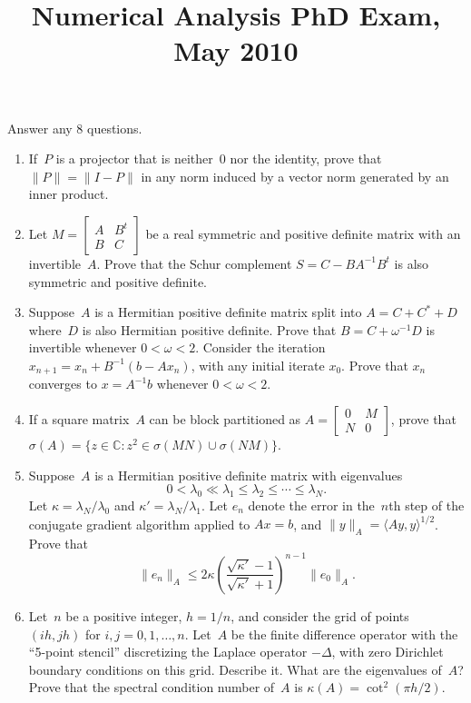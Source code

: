 \documentclass[11pt,letterpaper]{article}
\title{Numerical Analysis PhD Exam, May 2010}
\author{}
\date{}
\newenvironment{examproblems}[2]{%
  \def\ProblemHeadingTag{#2}%
  \AssignTaggingSocketPlug{block/list/label}{examproblem}%
  \begin{enumerate}%
  \setcounter{enumi}{#1}%
  \renewcommand{\labelenumi}{\textbf{\theenumi.}}%
  \setlength{\topsep}{0.35em}%
  \setlength{\partopsep}{0pt}%
  \setlength{\itemsep}{0.48em}%
  \setlength{\parsep}{0.18em}%
}{\end{enumerate}}
\newenvironment{examinstructions}{%
  \par\begingroup\itshape
}{%
  \par\endgroup\vspace{0.18em}
}
\begin{document}
\maketitle
\thispagestyle{empty}
\begin{examinstructions}
Answer any 8 questions.
\end{examinstructions}
\begin{examproblems}{0}{H2}
\def\ProblemHeadingText{Problem 1.}
\item
If~\(P\) is a projector that is neither~\(0\) nor the identity, prove that \(\lVert P\rVert=\lVert I-P\rVert\) in any norm induced by a vector norm generated by an inner product.
\def\ProblemHeadingText{Problem 2.}
\item
Let \(M=\begin{bmatrix}A&B^t\\B&C\end{bmatrix}\) be a real symmetric and positive definite matrix with an invertible~\(A\). Prove that the Schur complement \(S=C-BA^{-1}B^t\) is also symmetric and positive definite.
\def\ProblemHeadingText{Problem 3.}
\item
Suppose~\(A\) is a Hermitian positive definite matrix split into \(A=C+C^*+D\) where~\(D\) is also Hermitian positive definite. Prove that \(B=C+\omega^{-1}D\) is invertible whenever \(0<\omega<2\). Consider the iteration \(x_{n+1}=x_n+B^{-1}(b-Ax_n)\), with any initial iterate \(x_0\). Prove that \(x_n\) converges to \(x=A^{-1}b\) whenever \(0<\omega<2\).
\def\ProblemHeadingText{Problem 4.}
\item
If a square matrix~\(A\) can be block partitioned as \(A=\begin{bmatrix}0&M\\N&0\end{bmatrix}\), prove that \(\sigma(A)=\{z\in\mathbb{C}:z^2\in\sigma(MN)\cup\sigma(NM)\}\).
\def\ProblemHeadingText{Problem 5.}
\item
Suppose~\(A\) is a Hermitian positive definite matrix with eigenvalues
\[
0<\lambda_0\ll\lambda_1\leq\lambda_2\leq\cdots\leq\lambda_N.
\]
 Let \(\kappa=\lambda_N/\lambda_0\) and \(\kappa'=\lambda_N/\lambda_1\). Let \(e_n\) denote the error in the~\(n\)th step of the conjugate gradient algorithm applied to \(Ax=b\), and \(\lVert y\rVert_A=\langle Ay,y\rangle^{1/2}\). Prove that
\[
\lVert e_n\rVert_A\leq 2\kappa\left(\frac{\sqrt{\kappa'}-1}{\sqrt{\kappa'}+1}\right)^{n-1}\lVert e_0\rVert_A.
\]
\def\ProblemHeadingText{Problem 6.}
\item
Let~\(n\) be a positive integer, \(h=1/n\), and consider the grid of points \((ih,jh)\) for \(i,j=0,1,\ldots,n\). Let~\(A\) be the finite difference operator with the “5-point stencil” discretizing the Laplace operator \(-\Delta\), with zero Dirichlet boundary conditions on this grid. Describe it. What are the eigenvalues of~\(A\)? Prove that the spectral condition number of~\(A\) is \(\kappa(A)=\cot^2(\pi h/2)\).

\end{examproblems}
\end{document}
